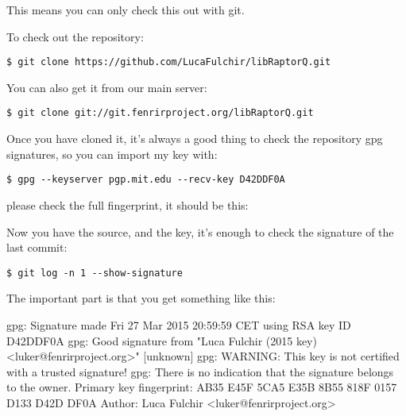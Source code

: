 \documentclass[11pt,a4paper]{refart}
\begin{document}
This means you can only check this out with git.

To check out the repository:

\begin{verbatim}
$ git clone https://github.com/LucaFulchir/libRaptorQ.git
\end{verbatim}

You can also get it from our main server:

\begin{verbatim}
$ git clone git://git.fenrirproject.org/libRaptorQ.git
\end{verbatim}

Once you have cloned it, it's always a good thing to check the repository gpg
signatures, so you can import my key with:

\begin{verbatim}
$ gpg --keyserver pgp.mit.edu --recv-key D42DDF0A
\end{verbatim}

please check the full fingerprint, it should be this:

\theverbbox
 

Now you have the source, and the key, it's enough to check the signature of the
last commit:

\begin{verbatim}
$ git log -n 1 --show-signature
\end{verbatim}

The important part is that you get something like this:

\begin{verbbox}[\footnotesize]
 gpg: Signature made Fri 27 Mar 2015 20:59:59 CET using RSA key ID D42DDF0A
 gpg: Good signature from "Luca Fulchir (2015 key) <luker@fenrirproject.org>"
 [unknown]
 gpg: WARNING: This key is not certified with a trusted signature!
 gpg:          There is no indication that the signature belongs to the owner.
 Primary key fingerprint: AB35 E45F 5CA5 E35B 8B55  818F 0157 D133 D42D DF0A
 Author: Luca Fulchir <luker@fenrirproject.org>
\end{verbbox}
\theverbbox
\end{document}
